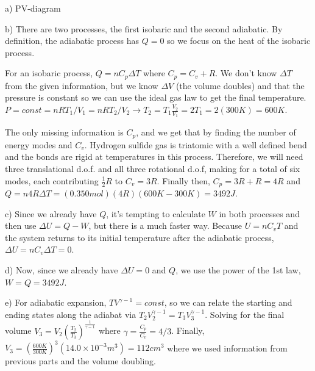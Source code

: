 \documentclass[10pt]{article}
\newenvironment{problem}[2][Problem]{\begin{trivlist}
\item[\hskip \labelsep {\bfseries #1}\hskip \labelsep {\bfseries #2.}]}{\end{trivlist}}
\begin{document}
\begin{problem}{3} 
\item a) PV-diagram
\item b) There are two processes, the first isobaric and the second adiabatic. By definition, the adiabatic process has $Q=0$ so we focus on the heat of the isobaric process.

For an isobaric process, $Q=nC_p\Delta T$ where $C_p = C_v + R$. We don't know $\Delta T$ from the given information, but we know $\Delta V$ (the volume doubles) and that the pressure is constant so we can use the ideal gas law to get the final temperature. $P=const=nRT_1/V_1=nRT_2/V_2 \xrightarrow[]{} T_2 = T_1 \frac{V_2}{V_1}= 2T_1=2(300K)=600K$.


The only missing information is $C_p$, and we get that by finding the number of energy modes and $C_v$. Hydrogen sulfide gas is triatomic with a well defined bend and the bonds are rigid at temperatures in this process. Therefore, we will need three translational d.o.f. and all three rotational d.o.f, making for a total of six modes, each contributing $\frac{1}{2}R$ to $C_v=3R$. Finally then, $C_p = 3R+R=4R$ and $Q=n4R\Delta T=(0.350mol)(4R)(600K-300K)=3492J$.

\item c) Since we already have $Q$, it's tempting to calculate $W$ in both processes and then use $\Delta U = Q - W$, but there is a much faster way. Because $U=nC_vT$ and the system returns to its initial temperature after the adiabatic process, $\Delta U = nC_v \Delta T = 0$.

\item d) Now, since we already have $\Delta U = 0$ and $Q$, we use the power of the 1st law, $W=Q=3492J$.
\item e) For adiabatic expansion, $TV^{\gamma-1}=const$, so we can relate the starting and ending states along the adiabat via $T_2V_2^{\gamma-1}=T_3V_3^{\gamma -1}$. Solving for the final volume $V_3=V_2\left(\frac{T_2}{T_3}\right)^{\frac{1}{\gamma-1}}$ where $\gamma = \frac{C_p}{C_v}=4/3$. Finally, $V_3=\left(\frac{600K}{300K}\right)^3(14.0\times10^{-3}m^3)=112 cm^3$ where we used information from previous parts and the volume doubling.
\end{problem}
\end{document}
